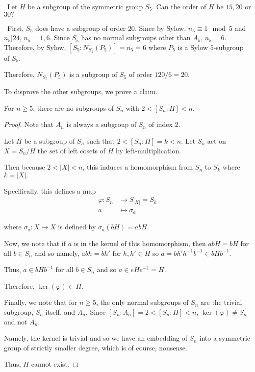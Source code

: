 \documentclass[12pt]{Qual}
\begin{document}
\begin{problem} $\,$
Let $H$ be a subgroup of the symmetric group $S_5$. Can the order of $H$ be $15,20$ or $30?$
\end{problem}


\begin{solution}$\,$
First, $S_5$ does have a subgroup of order $20$. Since by Sylow, $n_5\equiv 1\mod 5$ and $n_5|24$, $n_5=1,6$. Since $S_5$ has no normal subgroups other than $A_5$, $n_5=6$. Therefore, by Sylow, $[S_5:N_{S_5}(P_5)]=n_5=6$ where $P_5$ is a Sylow $5$-subgroup of $S_5$.

Therefore, $N_{S_5}(P_5)$ is a subgroup of $S_5$ of order $120/6=20.$

To disprove the other subgroups, we prove a claim.
\begin{claim} For $n\ge 5$, there are no subgroups of $S_n$ with $2<[S_n:H]<n$.
\begin{proof}
Note that $A_n$ is always a subgroup of $S_n$ of index $2.$

Let $H$ be a subgroup of $S_n$ such that $2<[S_n:H]=k<n$. Let $S_n$ act on $X=S_n/H$ the set of left cosets of $H$ by left-multiplication.

Then because $2<|X|<n$, this induces a homomorphism from $S_n$ to $S_k$ where $k=|X|.$

Specifically, this defines a map \begin{align*}
    \varphi:S_n&\to S_{|X|}=S_k\\
    a&\mapsto \sigma_a
\end{align*}

where $\sigma_a:X\to X$ is defined by $\sigma_a(bH)=abH$.

Now, we note that if $a$ is in the kernel of this homomorphism, then $abH=bH$ for all $b\in S_n$ and so namely, $abh=bh'$ for $h,h'\in H$ so $a=bh'h^{-1}b^{-1}\in bHb^{-1}.$

Thus, $a\in bHb^{-1}$ for all $b\in S_n$ and so $a\in eHe^{-1}=H$.

Therefore, $\ker(\varphi)\subset H$.

Finally, we note that for $n\ge 5$, the only normal subgroups of $S_n$ are the trivial subgroup, $S_n$ itself, and $A_n$. Since $[S_n:A_n]=2<[S_n:H]<n$, $\ker(\varphi)\not=S_n$ and not $A_n$.

Namely, the kernel is trivial and so we have an embedding of $S_n$ into a symmetric group of strictly smaller degree, which is of course, nonsense.

Thus, $H$ cannot exist.
\end{proof}
\end{claim}


\end{solution}
\end{document}
